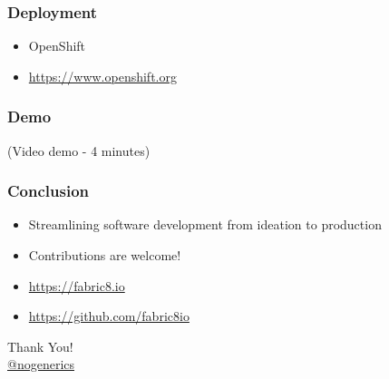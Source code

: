 \documentclass[aspectratio=169]{beamer}
\begin{document}
\begin{frame}
  \frametitle{Deployment}

\begin{itemize}
  \item<1-> OpenShift
  \item<2-> \url{https://www.openshift.org}
\end{itemize}
\end{frame}



\begin{frame}
  \frametitle{Demo}

  (Video demo - 4 minutes)

\end{frame}


\begin{frame}
  \frametitle{Conclusion}

\begin{itemize}
  \item<1-> Streamlining software development from ideation to production
  \item<2-> Contributions are welcome!
  \item<3-> \url{https://fabric8.io}
  \item<3-> \url{https://github.com/fabric8io}
\end{itemize}
\end{frame}


\begin{frame}%
\begin{center}
{\huge Thank You!}\\[1cm]
{\large \href{https://twitter.com/nogenerics}{@nogenerics}}
\end{center}
\end{frame}
\end{document}
